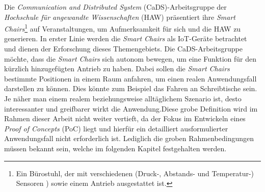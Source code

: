 Die \textit{Communication and Distributed System} (CaDS)-Arbeitsgruppe der \textit{Hochschule für angewandte Wissenschaften} (HAW) präsentiert ihre \textit{Smart Chairs}\footnote{Ein Bürostuhl, der mit verschiedenen (Druck-, Abstands- und Temperatur-) Sensoren \cite{web:smartChair}) sowie einem Antrieb ausgestattet ist.} auf Veranstaltungen, um Aufmerksamkeit für sich und die HAW zu generieren. In erster Linie werden die \textit{Smart Chairs} als IoT-Geräte betrachtet und dienen der Erforschung dieses Themengebiets.\newline
Die CaDS-Arbeitsgruppe möchte, dass die \textit{Smart Chairs} sich autonom bewegen, um eine Funktion für den kürzlich hinzugefügten Antrieb zu haben. Dabei sollen die \textit{Smart Chairs} bestimmte Positionen in einem Raum anfahren, um einen realen Anwendungsfall darstellen zu können. Dies könnte zum Beispiel das Fahren an Schreibtische sein. Je näher man einem realem beziehungsweise alltäglichem Szenario ist, desto interessanter und greifbarer wirkt die Anwendung.Diese grobe Definition wird im Rahmen dieser Arbeit nicht weiter vertieft, da der Fokus im Entwickeln eines \textit{Proof of Concepts} (PoC) liegt und hierfür ein detailliert ausformulierter Anwendungsfall nicht erforderlich ist. Lediglich die groben Rahmenbedingungen müssen bekannt sein, welche im folgenden Kapitel festgehalten werden.